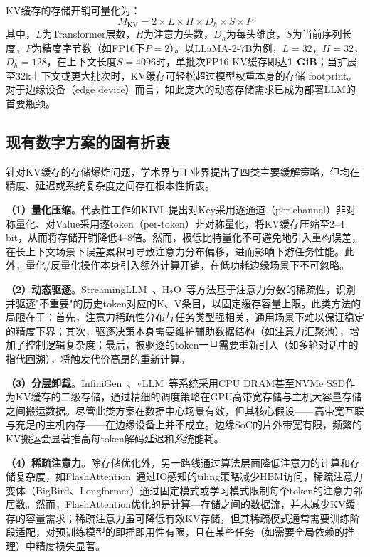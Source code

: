KV缓存的存储开销可量化为：
\begin{equation}
M_{\text{KV}} = 2 \times L \times H \times D_h \times S \times P
\label{eq:kv_memory}
\end{equation}
其中，$L$为Transformer层数，$H$为注意力头数，$D_h$为每头维度，$S$为当前序列长度，$P$为精度字节数（如FP16下$P=2$）。以LLaMA-2-7B为例，$L=32$，$H=32$，$D_h=128$，在上下文长度$S=4096$时，单批次FP16 KV缓存即达\textbf{1 GiB}；当扩展至32k上下文或更大批次时，KV缓存可轻松超过模型权重本身的存储 footprint。对于边缘设备（edge device）而言，如此庞大的动态存储需求已成为部署LLM的首要瓶颈。

\subsection{现有数字方案的固有折衷}

针对KV缓存的存储爆炸问题，学术界与工业界提出了四类主要缓解策略，但均在精度、延迟或系统复杂度之间存在根本性折衷。

\textbf{（1）量化压缩}。代表性工作如KIVI~\cite{liu2024kivi}提出对Key采用逐通道（per-channel）非对称量化、对Value采用逐token（per-token）非对称量化，将KV缓存压缩至2–4 bit，从而将存储开销降低4–8倍。然而，极低比特量化不可避免地引入重构误差，在长上下文场景下误差累积可导致注意力分布偏移，进而影响下游任务性能。此外，量化/反量化操作本身引入额外计算开销，在低功耗边缘场景下不可忽略。

\textbf{（2）动态驱逐}。StreamingLLM~\cite{xiao2024streamingllm}、H$_2$O~\cite{zhang2023h2o}等方法基于注意力分数的稀疏性，识别并驱逐"不重要"的历史token对应的K、V条目，以固定缓存容量上限。此类方法的局限在于：首先，注意力稀疏性分布与任务类型强相关，通用场景下难以保证稳定的精度下界；其次，驱逐决策本身需要维护辅助数据结构（如注意力汇聚池），增加了控制逻辑复杂度；最后，被驱逐的token一旦需要重新引入（如多轮对话中的指代回溯），将触发代价高昂的重新计算。

\textbf{（3）分层卸载}。InfiniGen~\cite{lee2024infinigen}、vLLM~\cite{kwon2023efficient}等系统采用CPU DRAM甚至NVMe SSD作为KV缓存的二级存储，通过精细的调度策略在GPU高带宽存储与主机大容量存储之间搬运数据。尽管此类方案在数据中心场景有效，但其核心假设——高带宽互联与充足的主机内存——在边缘设备上并不成立。边缘SoC的片外带宽有限，频繁的KV搬运会显著推高每token解码延迟和系统能耗。

\textbf{（4）稀疏注意力}。除存储优化外，另一路线通过算法层面降低注意力的计算和存储复杂度，如FlashAttention~\cite{dao2022flashattention}通过IO感知的tiling策略减少HBM访问，稀疏注意力变体（BigBird、Longformer）通过固定模式或学习模式限制每个token的注意力邻居数。然而，FlashAttention优化的是计算—存储之间的数据流，并未减少KV缓存的容量需求；稀疏注意力虽可降低有效KV存储，但其稀疏模式通常需要训练阶段适配，对预训练模型的即插即用性有限，且在某些任务（如需要全局依赖的推理）中精度损失显著。

